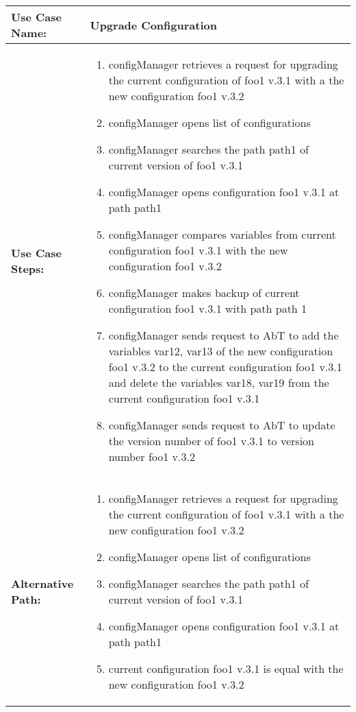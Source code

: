 
\begin{tabularx}{\linewidth}{|l|X|}
\hline
\textbf{Use Case Name:} & \textbf{Upgrade Configuration} \\
\hline
\textbf{Use Case Steps:} & 
\begin{minipage}{\linewidth} 
  \vspace{0.05em}
  \begin{enumerate}
	\item configManager retrieves a request for upgrading the current configuration of foo1 v.3.1 with a the new configuration foo1 v.3.2
	\item configManager opens list of configurations
	\item configManager searches the path path1 of current version of foo1 v.3.1
	\item configManager opens configuration foo1 v.3.1 at path path1
	\item configManager compares variables from current configuration foo1 v.3.1 with the new configuration foo1 v.3.2
	\item configManager makes backup of current configuration foo1 v.3.1 with path path 1
	\item configManager sends request to AbT to add the variables var12, var13 of the new configuration foo1 v.3.2 to the current configuration foo1 v.3.1 and delete the variables var18, var19 from the current configuration foo1 v.3.1
	\item configManager sends request to AbT to update the version number of foo1 v.3.1 to version number foo1 v.3.2
  \end{enumerate}
  \vspace{0.05em}
\end{minipage}
\\
\hline 
\textbf{Alternative Path:} &
\begin{minipage}{\linewidth}
  \vspace{0.05em} 
  \begin{enumerate}
	\item configManager retrieves a request for upgrading the current configuration of foo1 v.3.1 with a the new configuration foo1 v.3.2
	\item configManager opens list of configurations
	\item configManager searches the path path1 of current version of foo1 v.3.1
	\item configManager opens configuration foo1 v.3.1 at path path1
	\item current configuration foo1 v.3.1 is equal with the new configuration foo1 v.3.2
  \end{enumerate}
  \vspace{0.05em} 
\end{minipage}
\\
\hline
\end{tabularx}


